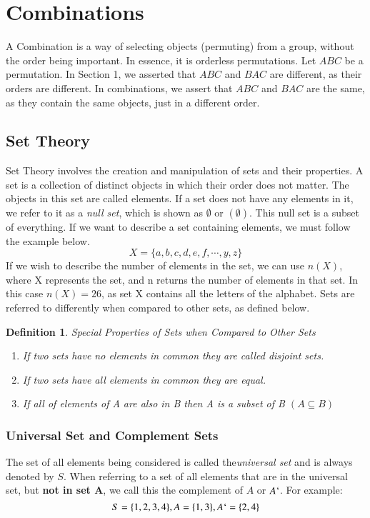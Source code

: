\documentclass[final,1p,12pt]{elsarticle}
\newtheorem{definition}{Definition}
\begin{document}
\section{Combinations}
A Combination is a way of selecting objects (permuting) from a group, without the order being important. In essence, it is orderless permutations. Let $ABC$ be a permutation. In Section 1, we asserted that $ABC$ and $BAC$ are different, as their orders are different. In combinations, we assert that $ABC$ and $BAC$ are the same, as they contain the same objects, just in a different order.

    \subsection{Set Theory}
    Set Theory involves the creation and manipulation of sets and their properties. A set is a collection of distinct objects in which their order does not matter. The objects in this set are called elements. If a set does not have any elements in it, we refer to it as a \emph{null set}, which is shown as $\emptyset$ or $(\emptyset)$. This null set is a subset of everything. If we want to describe a set containing elements, we must follow the example below.
    \begin{equation}
        X = \{a,b,c,d,e,f,\cdots,y,z\}
    \end{equation}
    If we wish to describe the number of elements in the set, we can use $n(X)$, where X represents the set, and n returns the number of elements in that set. In this case $n(X) = 26$, as set X contains all the letters of the alphabet. Sets are referred to differently when compared to other sets, as defined below.
    \begin{definition}
    Special Properties of Sets when Compared to Other Sets
    \begin{enumerate}
        \item If two sets have no elements in common they are called disjoint sets.
        \item If two sets have all elements in common they are equal.
        \item If all of elements of A are also in B then A is a subset of B $(A\subseteq B)$
    \end{enumerate}
    \end{definition}
    
        \subsubsection{Universal Set and Complement Sets}
        The set of all elements being considered is called the\emph{universal set} and is always denoted by $S$. When referring to a set of all elements that are in the universal set, but\textbf{ not in set A}, we call this the complement of $A$ or $A`$. For example:
        \begin{equation}
            S = \{1,2,3,4\}, A = \{1,3\}, A`=\{2,4\}
        \end{equation}
        
\end{document}
